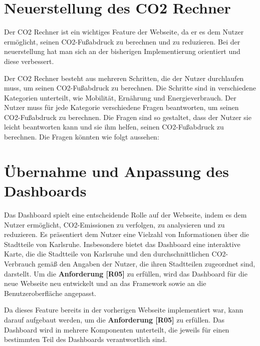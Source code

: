 \section{Neuerstellung des CO2 Rechner}


Der CO2 Rechner ist ein wichtiges Feature der Webseite, da er es dem Nutzer ermöglicht, seinen CO2-Fußabdruck zu berechnen und zu reduzieren. Bei der neuerstellung hat man sich an der bisherigen Implementierung orientiert und diese verbessert.

Der CO2 Rechner besteht aus mehreren Schritten, die der Nutzer durchlaufen muss, um seinen CO2-Fußabdruck zu berechnen. Die Schritte sind in verschiedene Kategorien unterteilt, wie Mobilität, Ernährung und Energieverbrauch. Der Nutzer muss für jede Kategorie verschiedene Fragen beantworten, um seinen CO2-Fußabdruck zu berechnen. Die Fragen sind so gestaltet, dass der Nutzer sie leicht beantworten kann und sie ihm helfen, seinen CO2-Fußabdruck zu berechnen. Die Fragen könnten wie folgt aussehen:


\section{Übernahme und Anpassung des Dashboards}

Das Dashboard spielt eine entscheidende Rolle auf der Webseite, indem es dem Nutzer ermöglicht, CO2-Emissionen zu verfolgen, zu analysieren und zu reduzieren. Es präsentiert dem Nutzer eine Vielzahl von Informationen über die Stadtteile von Karlsruhe. Insbesondere bietet das Dashboard eine interaktive Karte, die die Stadtteile von Karlsruhe und den durchschnittlichen CO2-Verbrauch gemäß den Angaben der Nutzer, die ihren Stadtteilen zugeordnet sind, darstellt. Um die \textbf{Anforderung [R05]} zu erfüllen, wird das Dashboard für die neue Webseite neu entwickelt und an das Framework sowie an die Benutzeroberfläche angepasst.

Da dieses Feature bereits in der vorherigen Webseite implementiert war, kann darauf aufgebaut werden, um die \textbf{Anforderung [R05]} zu erfüllen. Das Dashboard wird in mehrere Komponenten unterteilt, die jeweils für einen bestimmten Teil des Dashboards verantwortlich sind.

